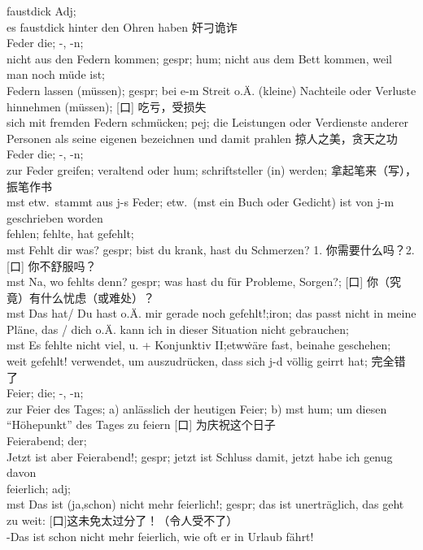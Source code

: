 \noindent
faustdick Adj;\\
es faustdick hinter den Ohren haben 奸刁诡诈\\

\noindent
Feder die; -, -n;\\
nicht aus den Federn kommen; gespr; hum; nicht aus dem Bett kommen, weil man noch m\"ude ist; \\
Federn lassen (m\"ussen); gespr; bei e-m Streit o.\"A. (kleine) Nachteile oder Verluste hinnehmen (m\"ussen); [口] 吃亏，受损失\\
sich mit fremden Federn schm\"ucken; pej; die Leistungen oder Verdienste anderer Personen als seine eigenen bezeichnen und damit prahlen 掠人之美，贪天之功\\

\noindent
Feder die; -, -n;\\
zur Feder greifen; veraltend oder hum; schriftsteller (in) werden; 拿起笔来（写），振笔作书\\
mst etw.\  stammt aus j-s Feder; etw.\ (mst ein Buch oder Gedicht) ist von j-m geschrieben worden\\

\noindent
fehlen; fehlte, hat gefehlt;\\
mst Fehlt dir was? gespr; bist du krank, hast du Schmerzen? 1. 你需要什么吗？2. [口] 你不舒服吗？\\
mst Na, wo fehlts denn? gespr; was hast du f\"ur Probleme, Sorgen?; [口] 你（究竟）有什么忧虑（或难处）？\\
mst Das hat/ Du hast o.\"A. mir gerade noch gefehlt!;iron; das passt nicht in meine Pl\"ane, das / dich o.\"A. kann ich in dieser Situation nicht gebrauchen;\\
mst Es fehlte nicht viel, u. + Konjunktiv II;etw\. w\"are fast, beinahe geschehen; \\
weit gefehlt! verwendet, um auszudr\"ucken, dass sich j-d v\"ollig geirrt hat; 完全错了\\

\noindent
Feier; die; -, -n;\\
zur Feier des Tages; a) anl\"asslich der heutigen Feier; b) mst hum; um diesen ``H\"ohepunkt'' des Tages zu feiern [口] 为庆祝这个日子\\

\noindent
Feierabend; der;\\
Jetzt ist aber Feierabend!; gespr; jetzt ist Schluss damit, jetzt habe ich genug davon \\

\noindent
feierlich; adj;\\
mst Das ist (ja,schon) nicht mehr feierlich!; gespr; das ist unertr\"aglich, das geht zu weit: [口]这未免太过分了！（令人受不了）\\
-Das ist schon nicht mehr feierlich, wie oft er in Urlaub f\"ahrt!\\

